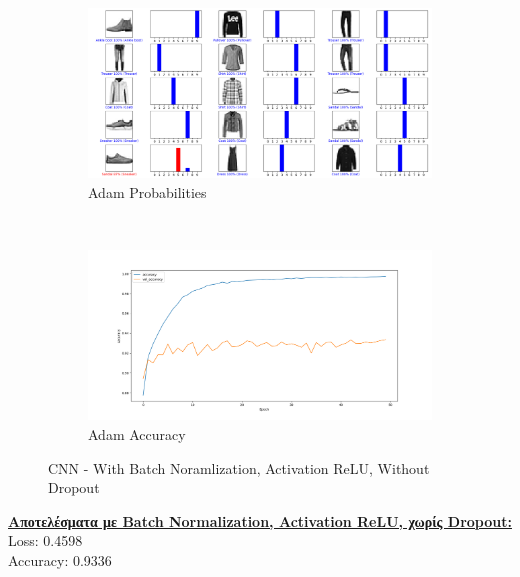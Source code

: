 \documentclass{article}
\begin{document}
	\begin{figure}[h!]
		\centering
		\begin{subfigure}[t]{0.5\textwidth}
			\centering
			\includegraphics[width=\linewidth]{../exercise3_3/images/fashion_cnn_without_dropout_probabilities.png}
			\caption{Adam Probabilities}
		\end{subfigure}%
		~
		\begin{subfigure}[t]{0.5\textwidth}
			\centering
			\includegraphics[width=\linewidth]{../exercise3_3/images/fashion_cnn_without_dropout_accuracy.png}
			\caption{Adam Accuracy}
		\end{subfigure}
		\caption{CNN - With Batch Noramlization, Activation ReLU, Without Dropout}
	\end{figure}
	\noindent
	\textbf{\underline{Aποτελέσματα με Batch Normalization, Activation ReLU, χωρίς Dropout:}}\\
	Loss: 0.4598 \\ 
	Accuracy: 0.9336
	
\end{document}
